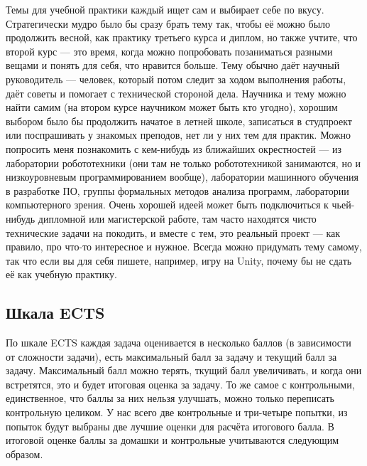 \documentclass[a5paper]{article}
\begin{document}
Темы для учебной практики каждый ищет сам и выбирает себе по вкусу. Стратегически мудро было бы сразу брать тему так, чтобы её можно было продолжить весной, как практику третьего курса и диплом, но также учтите, что второй курс --- это время, когда можно попробовать позаниматься разными вещами и понять для себя, что нравится больше. Тему обычно даёт научный руководитель --- человек, который потом следит за ходом выполнения работы, даёт советы и помогает с технической стороной дела. Научника и тему можно найти самим (на втором курсе научником может быть кто угодно), хорошим выбором было бы продолжить начатое в летней школе, записаться в студпроект или поспрашивать у знакомых преподов, нет ли у них тем для практик. Можно попросить меня познакомить с кем-нибудь из ближайших окрестностей --- из лаборатории робототехники (они там не только робототехникой занимаются, но и низкоуровневым программированием вообще), лаборатории машинного обучения в разработке ПО, группы формальных методов анализа программ, лаборатории компьютерного зрения. Очень хорошей идеей может быть подключиться к чьей-нибудь дипломной или магистерской работе, там часто находятся чисто технические задачи на покодить, и вместе с тем, это реальный проект --- как правило, про что-то интересное и нужное. Всегда можно придумать тему самому, так что если вы для себя пишете, например, игру на Unity, почему бы не сдать её как учебную практику.

\subsection{Шкала ECTS}

По шкале ECTS каждая задача оценивается в несколько баллов (в зависимости от сложности задачи), есть максимальный балл за задачу и текущий балл за задачу. Максимальный балл можно терять, ткущий балл увеличивать, и когда они встретятся, это и будет итоговая оценка за задачу. То же самое с контрольными, единственное, что баллы за них нельзя улучшать, можно только переписать контрольную целиком. У нас всего две контрольные и три-четыре попытки, из попыток будут выбраны две лучшие оценки для расчёта итогового балла. В итоговой оценке баллы за домашки и контрольные учитываются следующим образом.
\end{document}
